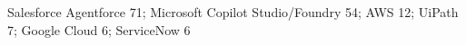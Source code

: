 Salesforce Agentforce 71; Microsoft Copilot Studio/Foundry 54; AWS 12; UiPath 7; Google Cloud 6; ServiceNow 6